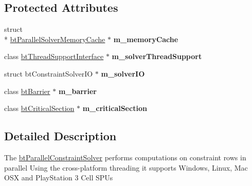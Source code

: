 \subsection*{Protected Attributes}
\begin{DoxyCompactItemize}
\item 
\hypertarget{classbt_parallel_constraint_solver_aab8c837b3c89b314454ca6d7ad83edcc}{struct \\*
\hyperlink{structbt_parallel_solver_memory_cache}{bt\+Parallel\+Solver\+Memory\+Cache} $\ast$ {\bfseries m\+\_\+memory\+Cache}}\label{classbt_parallel_constraint_solver_aab8c837b3c89b314454ca6d7ad83edcc}

\item 
\hypertarget{classbt_parallel_constraint_solver_aa8dbaf8f3936c2e812fdad475fd2ea0f}{class \hyperlink{classbt_thread_support_interface}{bt\+Thread\+Support\+Interface} $\ast$ {\bfseries m\+\_\+solver\+Thread\+Support}}\label{classbt_parallel_constraint_solver_aa8dbaf8f3936c2e812fdad475fd2ea0f}

\item 
\hypertarget{classbt_parallel_constraint_solver_ab7c9ca0afb6c236b1fc644d21bcbf68d}{struct bt\+Constraint\+Solver\+I\+O $\ast$ {\bfseries m\+\_\+solver\+I\+O}}\label{classbt_parallel_constraint_solver_ab7c9ca0afb6c236b1fc644d21bcbf68d}

\item 
\hypertarget{classbt_parallel_constraint_solver_ac976c5397d8e58e4c58e9ecb50237547}{class \hyperlink{classbt_barrier}{bt\+Barrier} $\ast$ {\bfseries m\+\_\+barrier}}\label{classbt_parallel_constraint_solver_ac976c5397d8e58e4c58e9ecb50237547}

\item 
\hypertarget{classbt_parallel_constraint_solver_aa8fbee3bf2eb4e9d278f25dbccaca8a9}{class \hyperlink{classbt_critical_section}{bt\+Critical\+Section} $\ast$ {\bfseries m\+\_\+critical\+Section}}\label{classbt_parallel_constraint_solver_aa8fbee3bf2eb4e9d278f25dbccaca8a9}

\end{DoxyCompactItemize}


\subsection{Detailed Description}
The \hyperlink{classbt_parallel_constraint_solver}{bt\+Parallel\+Constraint\+Solver} performs computations on constraint rows in parallel Using the cross-\/platform threading it supports Windows, Linux, Mac O\+S\+X and Play\+Station 3 Cell S\+P\+Us 

